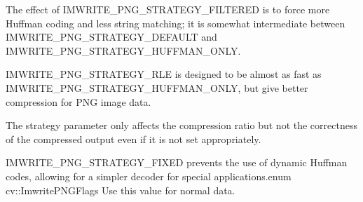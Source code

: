 \begin{DoxyItemize}
\item The effect of I\+M\+W\+R\+I\+T\+E\+\_\+\+P\+N\+G\+\_\+\+S\+T\+R\+A\+T\+E\+G\+Y\+\_\+\+F\+I\+L\+T\+E\+R\+ED is to force more Huffman coding and less string matching; it is somewhat intermediate between I\+M\+W\+R\+I\+T\+E\+\_\+\+P\+N\+G\+\_\+\+S\+T\+R\+A\+T\+E\+G\+Y\+\_\+\+D\+E\+F\+A\+U\+LT and I\+M\+W\+R\+I\+T\+E\+\_\+\+P\+N\+G\+\_\+\+S\+T\+R\+A\+T\+E\+G\+Y\+\_\+\+H\+U\+F\+F\+M\+A\+N\+\_\+\+O\+N\+LY.
\item I\+M\+W\+R\+I\+T\+E\+\_\+\+P\+N\+G\+\_\+\+S\+T\+R\+A\+T\+E\+G\+Y\+\_\+\+R\+LE is designed to be almost as fast as I\+M\+W\+R\+I\+T\+E\+\_\+\+P\+N\+G\+\_\+\+S\+T\+R\+A\+T\+E\+G\+Y\+\_\+\+H\+U\+F\+F\+M\+A\+N\+\_\+\+O\+N\+LY, but give better compression for P\+NG image data.
\item The strategy parameter only affects the compression ratio but not the correctness of the compressed output even if it is not set appropriately.
\item I\+M\+W\+R\+I\+T\+E\+\_\+\+P\+N\+G\+\_\+\+S\+T\+R\+A\+T\+E\+G\+Y\+\_\+\+F\+I\+X\+ED prevents the use of dynamic Huffman codes, allowing for a simpler decoder for special applications.\+enum cv\+::\+Imwrite\+P\+N\+G\+Flags Use this value for normal data. 
\end{DoxyItemize}
